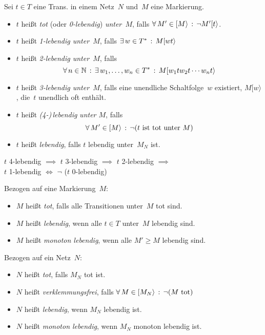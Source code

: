 \documentclass{cheat-sheet}
\newcommand{\activeTransition}[1]{[{#1}\rangle} %
\begin{document}
\begin{defn}
  Sei $t \in T$ eine Trans. in einem Netz~$N$ und~$M$ eine Markierung.
  \begin{itemize}
    \item $t$ heißt \emph{tot} (oder \textit{0-lebendig}) \textit{unter~$M$}, falls $\fa{M' \in \activeTransition{M}} \neg M' \activeTransition{t}$.
    \item $t$ heißt \textit{1-lebendig unter~$M$}, falls $\ex{w \in T^*} M \activeTransition{w t}$
    \item $t$ heißt \textit{2-lebendig unter~$M$}, falls
    \[ \fa{n \in \N} \ex{w_1, \ldots, w_n \in T^*} M \activeTransition{w_1 t w_2 t \cdots w_n t} \]
    \item $t$ heißt \textit{3-lebendig unter~$M$}, falls eine unendliche Schaltfolge~$w$ existiert, $M \activeTransition{w}$, die~$t$ unendlich oft enthält.
    \item $t$ heißt \emph{(4-)\,lebendig} \textit{unter $M$}, falls
    \[ \fa{M' \in \activeTransition{M}} \neg (t \text{ ist tot unter~$M$}) \]
    \item $t$ heißt \textit{lebendig}, falls $t$ lebendig unter~$M_N$ ist.
  \end{itemize}
\end{defn}

\begin{bem}
  \begin{minipage}[t]{0.8 \linewidth}
    $t$ 4-lebendig $\implies$ $t$ 3-lebendig $\implies$ $t$ 2-lebendig $\implies$ \\
    $t$ 1-lebendig $\iff$ $\neg$ ($t$ 0-lebendig)
  \end{minipage}
\end{bem}

\begin{defn}
  Bezogen auf eine Markierung~$M$:
  \begin{itemize}
    \item $M$ heißt \textit{tot}, falls alle Transitionen unter~$M$ tot sind.
    \item $M$ heißt \textit{lebendig}, wenn alle $t \in T$ unter~$M$ lebendig sind.
    \item $M$ heißt \emph{monoton lebendig}, wenn alle $M' \geq M$ lebendig sind.
  \end{itemize}
\end{defn}

\begin{defn}
  Bezogen auf ein Netz~$N$:
  \begin{itemize}
    \item $N$ heißt \textit{tot}, falls $M_N$ tot ist.
    \item $N$ heißt \emph{verklemmungsfrei}, falls $\fa{M \in \activeTransition{M_N}} \neg (M \text{ tot})$
    \item $N$ heißt \textit{lebendig}, wenn $M_N$ lebendig ist.
    \item $N$ heißt \textit{monoton lebendig}, wenn $M_N$ monoton lebendig ist.
  \end{itemize}
\end{defn}
\end{document}
